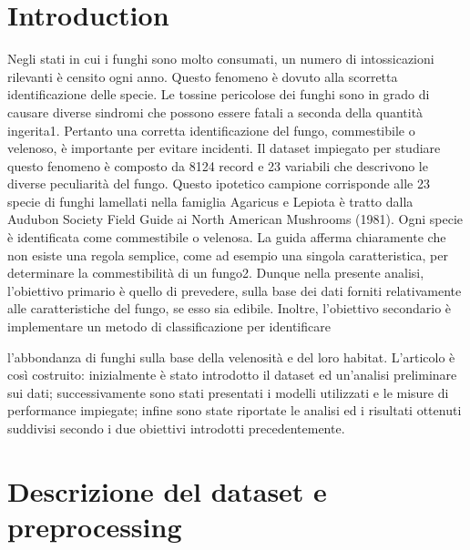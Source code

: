 \documentclass[fleqn,10pt]{SelfArx}
\affiliation{\textsuperscript{1}\textit{Department of Biology, University of Examples, London, United Kingdom}}
\affiliation{\textsuperscript{2}\textit{Department of Chemistry, University of Examples, London, United Kingdom}}
\affiliation{*\textbf{Corresponding author}: john@smith.com}
\begin{document}
\flushbottom

\maketitle
\tableofcontents

\thispagestyle{empty} 

\section*{Introduction}
Negli stati in cui i funghi sono molto consumati, un numero di intossicazioni rilevanti è censito ogni anno. Questo fenomeno è dovuto alla scorretta identificazione delle specie. Le tossine pericolose dei funghi sono in grado di causare diverse sindromi che possono essere fatali a seconda della quantità ingerita1. Pertanto una corretta identificazione del fungo, commestibile o velenoso, è importante per evitare incidenti. Il dataset impiegato per studiare questo fenomeno è composto da 8124 record e 23 variabili che descrivono le diverse peculiarità del fungo. Questo ipotetico campione corrisponde alle 23 specie di funghi lamellati nella famiglia Agaricus e Lepiota è tratto dalla Audubon Society Field Guide ai North American Mushrooms (1981). Ogni specie è identificata come commestibile o velenosa. La guida afferma chiaramente che non esiste una regola semplice, come ad esempio una singola caratteristica, per determinare la commestibilità di un fungo2.
Dunque nella presente analisi, l’obiettivo primario è quello di prevedere, sulla base dei dati forniti relativamente alle caratteristiche del fungo, se esso sia edibile. Inoltre, l’obiettivo secondario è implementare un metodo di classificazione per identificare

l’abbondanza di funghi sulla base della velenosità e del loro habitat.
L’articolo è così costruito: inizialmente è stato introdotto il dataset ed un’analisi preliminare sui dati; successivamente sono stati presentati i modelli utilizzati e le misure di performance impiegate; infine sono state riportate le analisi ed i risultati ottenuti suddivisi secondo i due obiettivi introdotti precedentemente.




\section{Descrizione del dataset e preprocessing}
\end{document}

